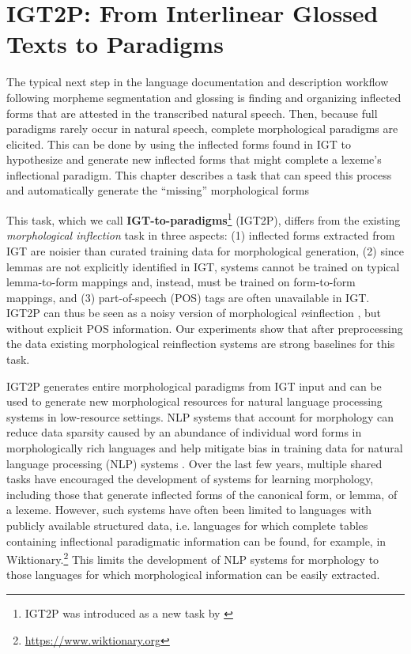\chapter{IGT2P: From Interlinear Glossed Texts to Paradigms}
\label{chap:IGT2P}


The typical next step in the language documentation and description workflow following morpheme segmentation and glossing is finding and organizing inflected forms that are attested in the transcribed natural speech. Then, because full paradigms rarely occur in natural speech, complete morphological paradigms are elicited. This can be done by using the inflected forms found in IGT to hypothesize and generate new inflected forms that might complete a lexeme's inflectional paradigm. This chapter describes a task that can speed this process and automatically generate the ``missing'' morphological forms

This task, which we call \textbf{IGT-to-paradigms}\footnote{IGT2P was introduced as a new task by \citet{moeller_igt2p_2020}} (IGT2P), differs from the existing \textit{morphological inflection} \citep{yarowsky-wicentowski-2000-minimally,faruqui-etal-2016-morphological} task in three aspects: (1) inflected forms extracted from IGT are noisier than curated training data for morphological generation, (2) since lemmas are not explicitly identified in IGT, systems cannot be trained on typical lemma-to-form mappings and, instead, must be trained on form-to-form mappings, and (3) part-of-speech (POS) tags are often unavailable in IGT. IGT2P can thus be seen as a noisy version of morphological \textit{re}inflection \citep{cotterell-etal-2016-sigmorphon}, but without explicit POS information. Our experiments show that after preprocessing the data existing morphological reinflection systems are strong baselines for this task. 

IGT2P generates entire morphological paradigms from IGT input and can be used to generate new morphological resources for natural language processing systems in low-resource settings. NLP systems that account for morphology can reduce data sparsity caused by an abundance of individual word forms in morphologically rich languages \citep{cotterell-etal-2016-sigmorphon,cotterell-etal-2017-conll,cotterell-etal-2018-conll,mccarthy-etal-2019-sigmorphon,vylomova2020sigmorphon} and help mitigate bias in training data for natural language processing (NLP) systems \citep{zmigrod-etal-2019-counterfactual}. Over the last few years, multiple shared tasks have encouraged the development of systems for learning morphology, including those that generate inflected forms of the canonical form, or lemma, of a lexeme.  However, such systems have often been limited to languages with publicly available structured data, i.e. languages for which complete tables containing inflectional paradigmatic information can be found, for example, in Wiktionary.\footnote{\url{https://www.wiktionary.org}} This limits the development of NLP systems for morphology to those languages for which morphological information can be easily extracted. 

